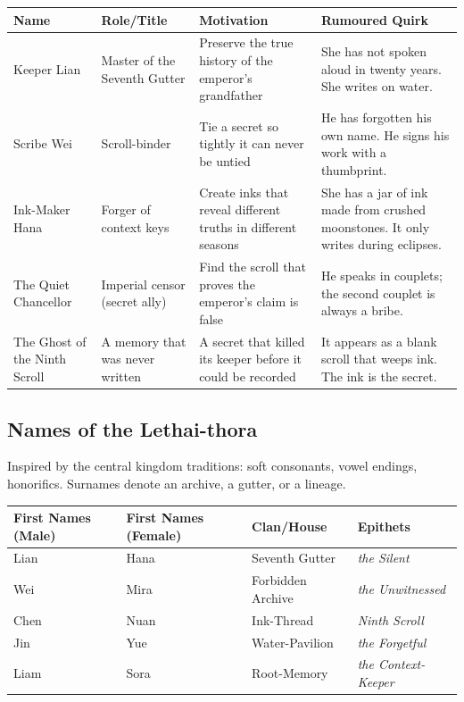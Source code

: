 \begin{longtable}{|p{}|p{}|p{}|p{}|}
\hline
\textbf{Name} & \textbf{Role/Title} & \textbf{Motivation} & \textbf{Rumoured Quirk} \\
\hline
Keeper Lian & Master of the Seventh Gutter & Preserve the true history of the emperor's grandfather & She has not spoken aloud in twenty years. She writes on water. \\
\hline
Scribe Wei & Scroll-binder & Tie a secret so tightly it can never be untied & He has forgotten his own name. He signs his work with a thumbprint. \\
\hline
Ink-Maker Hana & Forger of context keys & Create inks that reveal different truths in different seasons & She has a jar of ink made from crushed moonstones. It only writes during eclipses. \\
\hline
The Quiet Chancellor & Imperial censor (secret ally) & Find the scroll that proves the emperor's claim is false & He speaks in couplets; the second couplet is always a bribe. \\
\hline
The Ghost of the Ninth Scroll & A memory that was never written & A secret that killed its keeper before it could be recorded & It appears as a blank scroll that weeps ink. The ink is the secret. \\
\hline
\end{longtable}

\subsection*{Names of the Lethai-thora}
\label{sec:lethai-thora-names}

Inspired by the central kingdom traditions: soft consonants, vowel endings, honorifics. Surnames denote an archive, a gutter, or a lineage.

\begin{longtable}{|p{}|p{}|p{}|p{}|}
\hline
\textbf{First Names (Male)} & \textbf{First Names (Female)} & \textbf{Clan/House} & \textbf{Epithets} \\
\hline
Lian & Hana & Seventh Gutter & \textit{the Silent} \\
\hline
Wei & Mira & Forbidden Archive & \textit{the Unwitnessed} \\
\hline
Chen & Nuan & Ink-Thread & \textit{Ninth Scroll} \\
\hline
Jin & Yue & Water-Pavilion & \textit{the Forgetful} \\
\hline
Liam & Sora & Root-Memory & \textit{the Context-Keeper} \\
\hline
\end{longtable}

